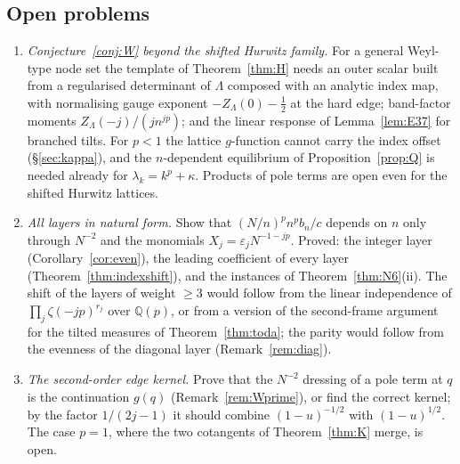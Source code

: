 \subsection{Open problems}\label{sec:open}
\begin{problem}\label{prob:open}
\begin{enumerate}
\item[(a)] \emph{Conjecture~\ref{conj:W} beyond the shifted Hurwitz family.} For a general Weyl-type node set the template of
Theorem~\ref{thm:H} needs an outer scalar built from a regularised determinant of $\Lambda$ composed with an analytic index map, with
normalising gauge exponent $-Z_\Lambda(0)-\frac12$ at the hard edge; band-factor moments $Z_\Lambda(-j)/(jn^{jp})$; and the linear response of
Lemma~\ref{lem:E37} for branched tilts. For $p<1$ the lattice $g$-function cannot carry the index offset (\S\ref{sec:kappa}), and the
$n$-dependent equilibrium of Proposition~\ref{prop:Q} is needed already for $\lambda_k=k^p+\kappa$. Products of pole terms are open even for
the shifted Hurwitz lattices.
\item[(b)] \emph{All layers in natural form.} Show that $(N/n)^pn^pb_n/c$ depends on $n$ only through $N^{-2}$ and the monomials
$X_j=\varepsilon_jN^{-1-jp}$. Proved: the integer layer (Corollary~\ref{cor:even}), the leading coefficient of every layer
(Theorem~\ref{thm:indexshift}), and the instances of Theorem~\ref{thm:N6}(ii). The shift of the layers of weight $\ge3$ would follow from the
linear independence of $\prod_j\zeta(-jp)^{r_j}$ over $\mathbb Q(p)$, or from a version of the second-frame argument for the tilted measures of
Theorem~\ref{thm:toda}; the parity would follow from the evenness of the diagonal layer (Remark~\ref{rem:diag}).
\item[(c)] \emph{The second-order edge kernel.} Prove that the $N^{-2}$ dressing of a pole term at $q$ is the continuation $g(q)$
(Remark~\ref{rem:Wprime}), or find the correct kernel; by the factor $1/(2j-1)$ it should combine $(1-u)^{-1/2}$ with $(1-u)^{1/2}$. The case $p=1$,
where the two cotangents of Theorem~\ref{thm:K} merge, is open.
\end{enumerate}
\end{problem}
